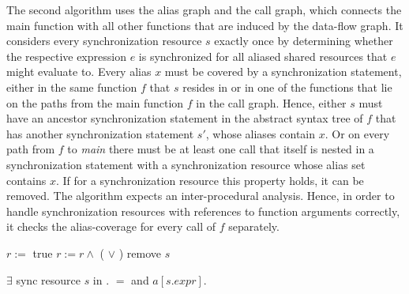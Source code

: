 The second algorithm uses the alias graph and the call graph, which connects the main function with all other functions that are induced by the data-flow graph. It considers every synchronization resource $s$ exactly once by determining whether the respective expression $e$ is synchronized for all aliased shared resources that $e$ might evaluate to. Every alias $x$ must  be covered by a synchronization statement, either in the same function $f$ that $s$ resides in or in one of the functions that lie on the paths from the main function $f$ in the call graph. Hence, either $s$ must have an ancestor synchronization statement in the abstract syntax tree of $f$ that has another synchronization statement $s'$, whose aliases contain $x$. Or on every path from $f$ to \textit{main} there must be at least one call that itself is nested in a synchronization statement with a synchronization resource whose alias set contains $x$. If for a synchronization resource this property holds, it can be removed. The algorithm expects an inter-procedural analysis. Hence, in order to handle synchronization resources with references to function arguments correctly, it checks the alias-coverage for every call of $f$ separately.

\begin{algorithmic}
\State {}
    \State $r :=$ true 
      \State $r := r \land$ ( $\lor$  )
    \EndFor
      \State remove $s$
    \EndIf
  \EndFor
\EndFor
\EndFunction
\end{algorithmic}


\begin{algorithmic}
\State {}
\State \Return $\exists$ sync resource $s$ in  $.$  $=$  and $a[s.\mathit{expr}]$.
\EndFunction
\end{algorithmic}

